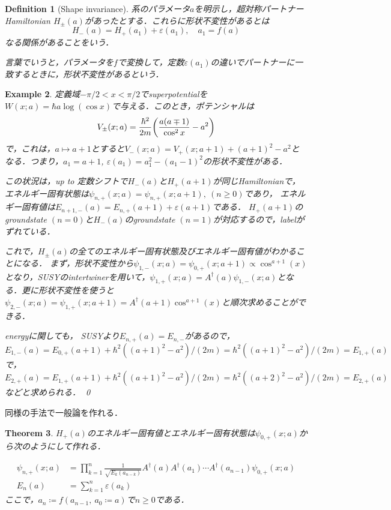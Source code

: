 \documentclass[english, dvipdfmx, a4paper]{jsarticle}
\theoremstyle{break}
\newtheorem{thm}{Theorem}
\newtheorem{defn}[thm]{Definition}
\newtheorem{eg}[thm]{Example}
\begin{document}
	\begin{defn}[Shape invariance]
		系のパラメータ$a$を明示し，超対称パートナーHamiltonian $H_{\pm}(a)$があったとする．これらに形状不変性があるとは
		\begin{equation}
			H_{-}(a) = H_+(a_1) + \varepsilon(a_1), \quad a_1 = f(a)
		\end{equation}
		なる関係があることをいう．

		言葉でいうと，パラメータを$f$で変換して，定数$\varepsilon(a_1)$の違いでパートナーに一致するときに，形状不変性があるという．
	\end{defn}
	\begin{eg}
		定義域$-\pi/2 < x < \pi/2$でsuperpotentialを$W(x; a) = \hbar a \log(\cos x)$で与える．このとき，ポテンシャルは
		\begin{equation}
			V_{\pm} (x; a) = \frac{\hbar^2}{2m} \qty(\frac{a(a\mp1)}{\cos^2x} - a^2)
		\end{equation}
		で，これは，$a\mapsto a+1$とすると$V_-(x; a) = V_+(x; a+1) + (a+1)^2-a^2$となる．つまり，$a_1 = a+1$, $\varepsilon(a_1) = a_1^2 - (a_1-1)^2$の形状不変性がある．

		この状況は，up to 定数シフトで$H_-(a)$と$H_+(a+1)$が同じHamiltonianで，エネルギー固有状態は$\psi_{n, +}(x; a) = \psi_{n, +}(x; a+1),\ (n\geq0)$であり，
		エネルギー固有値は$E_{n+1, -}(a) = E_{n, +}(a+1) + \varepsilon(a+1)$である．
		$H_+(a+1)$のgroundstate $(n=0)$と$H_-(a)$のgroundstate $(n=1)$が対応するので，labelがずれている．

		これで，$H_{\pm}(a)$の全てのエネルギー固有状態及びエネルギー固有値がわかることになる．
		まず，形状不変性から$\psi_{1, -}(x; a) = \psi_{0, +}(x; a+1)\propto \cos^{a+1}(x)$となり，SUSYのintertwinerを用いて，$\psi_{1, +}(x; a) = A^{\dagger}(a)\psi_{1, -}(x; a)$となる．更に形状不変性を使うと$\psi_{2, -}(x; a) = \psi_{1, +}(x; a+1) = A^{\dagger}(a+1)\cos^{a+1}(x)$と順次求めることができる．

		energyに関しても，
		SUSYより$E_{n, +}(a) = E_{n, -}$があるので，
		$E_{1, -}(a) = E_{0, +}(a+1) + \hbar^2((a+1)^2-a^2)/(2m) = \hbar^2((a+1)^2-a^2)/(2m) = E_{1, +}(a)$で，$E_{2, +}(a) = E_{1, +}(a+1) + \hbar^2((a+1)^2-a^2)/(2m) = \hbar^2((a+2)^2-a^2)/(2m) = E_{2, +}(a)$などと求められる．
		\qed
	\end{eg}

	同様の手法で一般論を作れる．
	\begin{thm}
		$H_+(a)$のエネルギー固有値とエネルギー固有状態は$\psi_{0, +}(x; a)$から次のようにして作れる．

		\begin{align}
			\psi_{n, +}(x; a) &= \prod_{k=1}^n\frac{1}{\sqrt{E_k(a_{n-k})}}A^{\dagger}(a)A^{\dagger}(a_1)\cdots A^{\dagger}(a_{n-1})\psi_{0, +}(x; a)\\
			E_n(a) &= \sum_{k=1}^{n}\varepsilon(a_k)
		\end{align}
		ここで，$a_n\coloneqq f(a_{n-1},\ a_0\coloneqq a)$で$n\geq 0$である．
	\end{thm}
\end{document}
